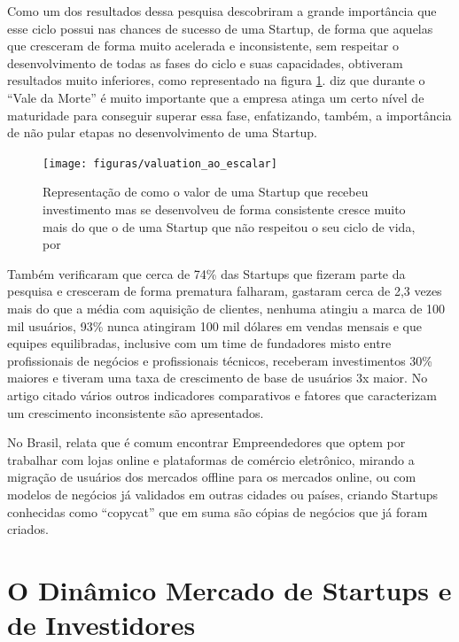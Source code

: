 Como um dos resultados dessa pesquisa descobriram a grande importância que esse ciclo possui nas chances de sucesso de uma Startup, de forma que aquelas que cresceram de forma muito acelerada e inconsistente, sem respeitar o desenvolvimento de todas as fases do ciclo e suas capacidades, obtiveram resultados muito inferiores, como representado na figura \ref{figure:valuation_ao_escalar}.  diz que durante o ``Vale da Morte'' é muito importante que a empresa atinga um certo nível de maturidade para conseguir superar essa fase, enfatizando, também, a importância de não pular etapas no desenvolvimento de uma Startup.

\begin{figure}[!htb]
\centering
\texttt{[image: figuras/valuation\_ao\_escalar]}
\caption{Representação de como o valor de uma Startup que recebeu investimento mas se desenvolveu de forma consistente cresce muito mais do que o de uma Startup que não respeitou o seu ciclo de vida, por \cite{marmer2011startup}}
\label{figure:valuation_ao_escalar}
\end{figure}

Também verificaram que cerca de 74\% das Startups que fizeram parte da pesquisa e cresceram de forma prematura falharam, gastaram cerca de 2,3 vezes mais do que a média com aquisição de clientes, nenhuma atingiu a marca de 100 mil usuários, 93\% nunca atingiram 100 mil dólares em vendas mensais e que equipes equilibradas, inclusive com um time de fundadores misto entre profissionais de negócios e profissionais técnicos, receberam investimentos 30\% maiores e tiveram uma taxa de crescimento de base de usuários 3x maior. No artigo citado vários outros indicadores comparativos e fatores que caracterizam um crescimento inconsistente são apresentados. 

No Brasil,  relata que é comum encontrar Empreendedores que optem por trabalhar com lojas online e plataformas de comércio eletrônico, mirando a migração de usuários dos mercados offline para os mercados online, ou com modelos de negócios já validados em outras cidades ou países, criando Startups conhecidas como ``copycat'' que em suma são cópias de negócios que já foram criados.

\section{O Dinâmico Mercado de Startups e de Investidores}
\label{section:o_dinamico_mercado_das_startups}

